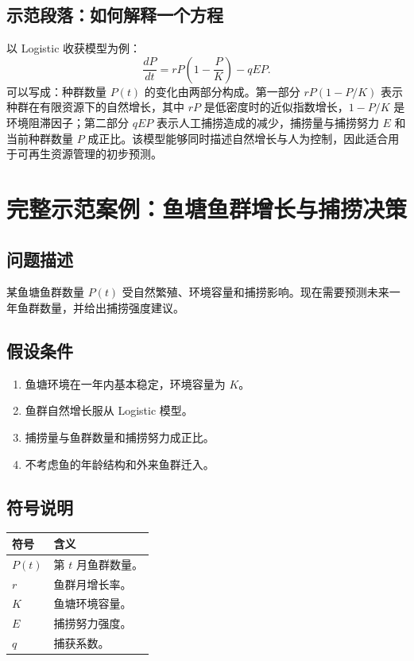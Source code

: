 \documentclass[11pt,a4paper]{ctexart}
\begin{document}
\subsection{示范段落：如何解释一个方程}
以 Logistic 收获模型为例：
\[
\frac{dP}{dt}=rP\left(1-\frac{P}{K}\right)-qEP.
\]
可以写成：种群数量 $P(t)$ 的变化由两部分构成。第一部分 $rP(1-P/K)$ 表示种群在有限资源下的自然增长，其中 $rP$ 是低密度时的近似指数增长，$1-P/K$ 是环境阻滞因子；第二部分 $qEP$ 表示人工捕捞造成的减少，捕捞量与捕捞努力 $E$ 和当前种群数量 $P$ 成正比。该模型能够同时描述自然增长与人为控制，因此适合用于可再生资源管理的初步预测。

\section{完整示范案例：鱼塘鱼群增长与捕捞决策}

\subsection{问题描述}
某鱼塘鱼群数量 $P(t)$ 受自然繁殖、环境容量和捕捞影响。现在需要预测未来一年鱼群数量，并给出捕捞强度建议。

\subsection{假设条件}
\begin{enumerate}[itemsep=0.2em]
\item 鱼塘环境在一年内基本稳定，环境容量为 $K$。
\item 鱼群自然增长服从 Logistic 模型。
\item 捕捞量与鱼群数量和捕捞努力成正比。
\item 不考虑鱼的年龄结构和外来鱼群迁入。
\end{enumerate}

\subsection{符号说明}
\begin{longtable}{>{\centering\arraybackslash}p{2.2cm}p{10.8cm}}
\toprule
符号 & 含义 \\
\midrule
$P(t)$ & 第 $t$ 月鱼群数量。\\
$r$ & 鱼群月增长率。\\
$K$ & 鱼塘环境容量。\\
$E$ & 捕捞努力强度。\\
$q$ & 捕获系数。\\
\bottomrule
\end{longtable}
\end{document}
